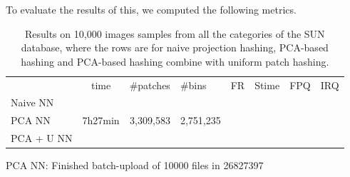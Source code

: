 To evaluate the results of this, we computed the following metrics.


\begin{table}
\begin{tabular}{ l | c || r }
& time & #patches & #bins & FR & Stime & FPQ & IRQ \\
Naive NN & & & & & & \\
PCA NN & 7h27min & 3,309,583 & 2,751,235 & & &  \\
PCA + U NN & & & & & &
\end{tabular}
\caption{Results on 10,000 images samples from all
the categories of the SUN database, where the rows
are for naive projection hashing, PCA-based hashing and
PCA-based hashing combine with uniform patch hashing.}
\label{tb:nn-res}
\end{table}

PCA NN: Finished batch-upload of 10000 files in 26827397
